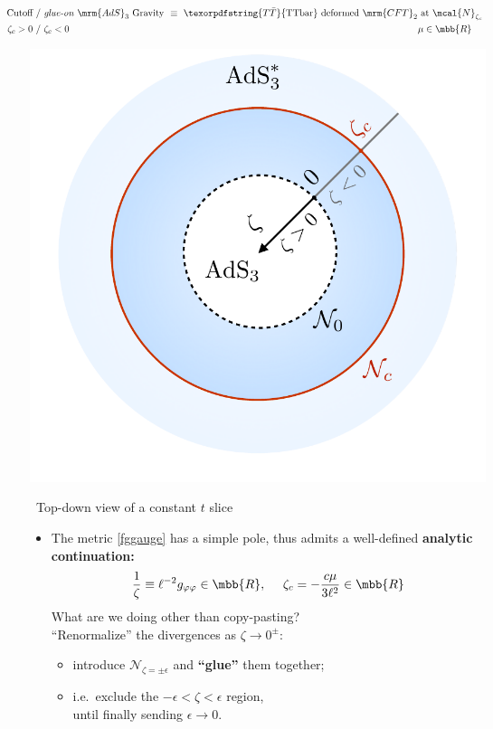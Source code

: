 \documentclass[10pt]{article}
\newcommand{\TTbar}{\texorpdfstring{\ensuremath{T\bar{T}}}{TTbar}\xspace}
\begin{document}
\begin{multicols}{3}
\parbox{\linewidth}{
\vspace{-\baselineskip}
\textbf{\begin{equation*}
\hspace{-2.8em}
\begin{aligned}
	\textrm{Cutoff}
	\ &/\ %
	\text{\textit{glue-on} $\mrm{AdS}_3$ Gravity}
	\!\!&\equiv\ %
	\textrm{\TTbar deformed $\mrm{CFT}_2$ at $\mcal{N}_{\zeta_c}$} \\
	\zeta_c > 0
	\ &/\ %
	\zeta_c < 0
	& \mu \in \mbb{R}\hspace{1em}\,
\end{aligned}
\end{equation*}}
\begin{center}
	\vspace{-1\baselineskip}%
	\centering
	\includegraphics[width=.7\linewidth]{img/diagram.pdf}
	
	\vspace{-.45\baselineskip}
	\scriptsize\ Top-down view of a constant $t$ slice
\end{center}
}

\begin{itemize}

\item The metric \eqref{fggauge} has a simple pole, thus admits a well-defined \textbf{analytic continuation:}
\begin{equation}
	\frac{1}{\zeta} \equiv \ell^{-2} g_{\varphi\varphi} \in \mbb{R},
\ \quad
	\zeta_c = - \frac{c \mu}{3\ell^2} \in \mbb{R}
\end{equation}
What are we doing other than copy-pasting?\\
``Renormalize'' the divergences as $\zeta \to 0^\pm$:
	\begin{itemize}[noitemsep]\small
	\item introduce $\mathcal N_{\zeta={\pm\epsilon}}$ and \textbf{``glue''} them together;
	\item i.e.~exclude the $-\epsilon < \zeta < \epsilon$ region, \\ until finally sending $\epsilon \to 0$. 
	\end{itemize}
	

\end{itemize}
\end{multicols}
\end{document}
